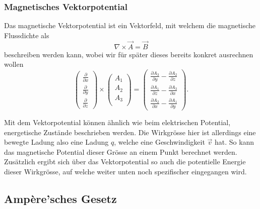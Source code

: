 \subsubsection{Magnetisches Vektorpotential}

Das magnetische Vektorpotential ist ein Vektorfeld, mit welchem die magnetische Flussdichte als 
\begin{equation}
	\nabla \times \vec{A}
	=
	\vec{B}
	\label{maxwell:definitionVektorpot}
\end{equation}
beschreiben werden kann, wobei wir für später dieses bereits konkret ausrechnen wollen 
\begin{equation}
	\renewcommand{\arraystretch}{1.9}
	\begin{pmatrix}
		\displaystyle
		\frac{\partial}{\partial x} \\
		\displaystyle
		\frac{\partial}{\partial y} \\
		\displaystyle
		\frac{\partial}{\partial z}
	\end{pmatrix}
	\times
	\begin{pmatrix}
		\displaystyle
		A_1 \\
		A_2 \\
		A_3 \\
	\end{pmatrix}
	=
	\begin{pmatrix}
		\displaystyle
		\frac{\partial A_3}{\partial y} -\frac{\partial A_2}{\partial z}\\
		\displaystyle
		\frac{\partial A_1}{\partial z} -\frac{\partial A_3}{\partial x}\\
		\displaystyle
		\frac{\partial A_2}{\partial x} -\frac{\partial A_1}{\partial y}
	\end{pmatrix}.
\end{equation}

Mit dem Vektorpotential können ähnlich wie beim elektrischen Potential, energetische Zustände beschrieben werden. Die Wirkgrösse hier ist allerdings eine bewegte Ladung also eine Ladung $q$, welche eine Geschwindigkeit $\vec{v}$ hat. So kann das magnetische Potential dieser Grösse an einem Punkt berechnet werden. Zusätzlich ergibt sich über das Vektorpotential so auch die potentielle Energie dieser Wirkgrösse, auf welche weiter unten noch spezifischer eingegangen wird.


\subsection{Ampère'sches Gesetz}

